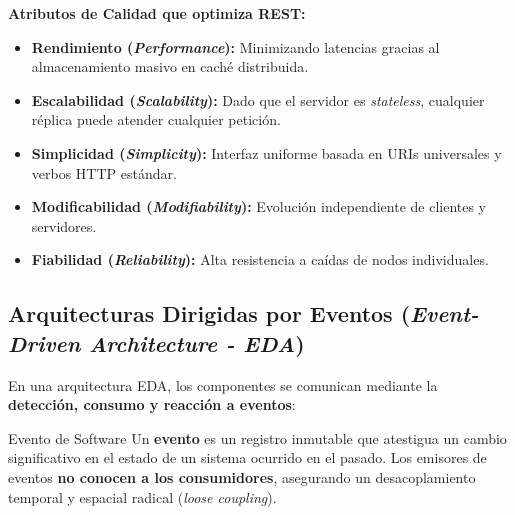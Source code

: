 \textbf{Atributos de Calidad que optimiza REST:}
\begin{itemize}[leftmargin=1.5em]
  \item \textbf{Rendimiento (\emph{Performance}):} Minimizando latencias gracias al almacenamiento masivo en caché distribuida.
  \item \textbf{Escalabilidad (\emph{Scalability}):} Dado que el servidor es \emph{stateless}, cualquier réplica puede atender cualquier petición.
  \item \textbf{Simplicidad (\emph{Simplicity}):} Interfaz uniforme basada en URIs universales y verbos HTTP estándar.
  \item \textbf{Modificabilidad (\emph{Modifiability}):} Evolución independiente de clientes y servidores.
  \item \textbf{Fiabilidad (\emph{Reliability}):} Alta resistencia a caídas de nodos individuales.
\end{itemize}

\subsection{Arquitecturas Dirigidas por Eventos (\emph{Event-Driven Architecture - EDA})}

En una arquitectura EDA, los componentes se comunican mediante la \textbf{detección, consumo y reacción a eventos}:

\begin{definicion}{Evento de Software}
Un \textbf{evento} es un registro inmutable que atestigua un cambio significativo en el estado de un sistema ocurrido en el pasado. Los emisores de eventos \textbf{no conocen a los consumidores}, asegurando un desacoplamiento temporal y espacial radical (\emph{loose coupling}).
\end{definicion}

